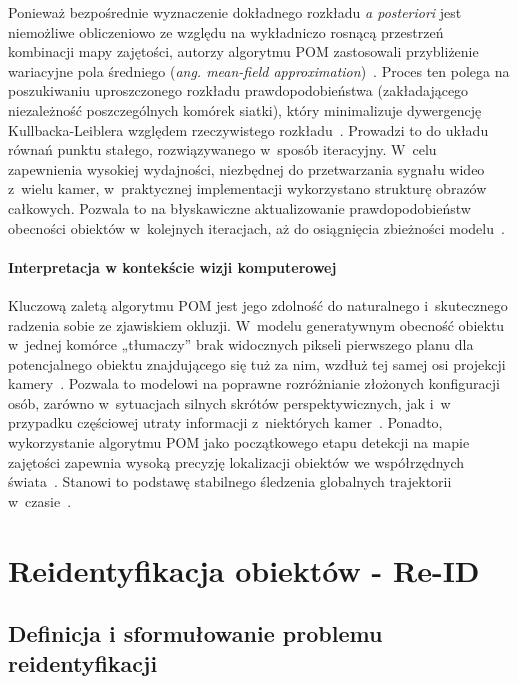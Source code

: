 Ponieważ bezpośrednie wyznaczenie dokładnego rozkładu \textit{a posteriori} jest niemożliwe
obliczeniowo ze względu na wykładniczo rosnącą przestrzeń kombinacji mapy zajętości, autorzy
algorytmu POM zastosowali przybliżenie wariacyjne pola średniego (\textit{ang. mean-field
  approximation})~\cite{fleuret2008}. Proces ten polega na poszukiwaniu uproszczonego rozkładu
prawdopodobieństwa (zakładającego niezależność poszczególnych komórek siatki), który minimalizuje
dywergencję Kullbacka-Leiblera względem rzeczywistego rozkładu~\cite{fleuret2008}. Prowadzi to do
układu równań punktu stałego, rozwiązywanego w~sposób iteracyjny. W~celu zapewnienia wysokiej
wydajności, niezbędnej do przetwarzania sygnału wideo z~wielu kamer, w~praktycznej implementacji
wykorzystano strukturę obrazów całkowych. Pozwala to na błyskawiczne aktualizowanie
prawdopodobieństw obecności obiektów w~kolejnych iteracjach, aż do osiągnięcia zbieżności
modelu~\cite{fleuret2008}.

\paragraph{Interpretacja w kontekście wizji komputerowej}

Kluczową zaletą algorytmu POM jest jego zdolność do naturalnego i~skutecznego radzenia sobie ze
zjawiskiem okluzji. W~modelu generatywnym obecność obiektu w~jednej komórce „tłumaczy” brak
widocznych pikseli pierwszego planu dla potencjalnego obiektu znajdującego się tuż za nim, wzdłuż
tej samej osi projekcji kamery~\cite{fleuret2008}. Pozwala to modelowi na poprawne rozróżnianie
złożonych konfiguracji osób, zarówno w~sytuacjach silnych skrótów perspektywicznych, jak i~w
przypadku częściowej utraty informacji z~niektórych kamer~\cite{fleuret2008}. Ponadto,
wykorzystanie algorytmu POM jako początkowego etapu detekcji na mapie zajętości zapewnia wysoką
precyzję lokalizacji obiektów we współrzędnych świata~\cite{mandeljc2013tracking}. Stanowi to
podstawę stabilnego śledzenia globalnych trajektorii w~czasie~\cite{mandeljc2013tracking}.

\section{Reidentyfikacja obiektów - Re-ID}
\label{sec:reidentyfikacja_reid}

\subsection{Definicja i sformułowanie problemu reidentyfikacji}
\label{subsec:definicja_reid}

